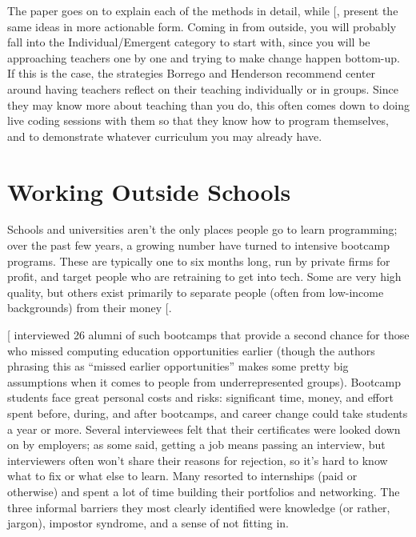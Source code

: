 The paper goes on to explain each of the methods in detail, while
{[},\protect[\hyperlink{b:Hend2015b}{Hend2015b}]{]} present the same ideas in more actionable
form. Coming in from outside, you will probably fall into the
Individual/Emergent category to start with, since you will be
approaching teachers one by one and trying to make change happen
bottom-up. If this is the case, the strategies Borrego and Henderson
recommend center around having teachers reflect on their teaching
individually or in groups. Since they may know more about teaching than
you do, this often comes down to doing live coding sessions with them so
that they know how to program themselves, and to demonstrate whatever
curriculum you may already have.

\section{Working Outside Schools}\label{s:partner-outside}

Schools and universities aren't the only places people go to learn
programming; over the past few years, a growing number have turned to
intensive bootcamp programs. These are typically one to six months long,
run by private firms for profit, and target people who are retraining to
get into tech. Some are very high quality, but others exist primarily to
separate people (often from low-income backgrounds) from their money
{[}\protect[\hyperlink{b:McMi2017}{McMi2017}]{]}.

{[}\protect[\hyperlink{b:Thay2017}{Thay2017}]{]} interviewed 26 alumni of such bootcamps that provide
a second chance for those who missed computing education opportunities
earlier (though the authors phrasing this as ``missed earlier
opportunities'' makes some pretty big assumptions when it comes to people
from underrepresented groups). Bootcamp students face great personal
costs and risks: significant time, money, and effort spent before,
during, and after bootcamps, and career change could take students a
year or more. Several interviewees felt that their certificates were
looked down on by employers; as some said, getting a job means passing
an interview, but interviewers often won't share their reasons for
rejection, so it's hard to know what to fix or what else to learn. Many
resorted to internships (paid or otherwise) and spent a lot of time
building their portfolios and networking. The three informal barriers
they most clearly identified were knowledge (or rather, jargon),
impostor syndrome, and a sense of not fitting in.

